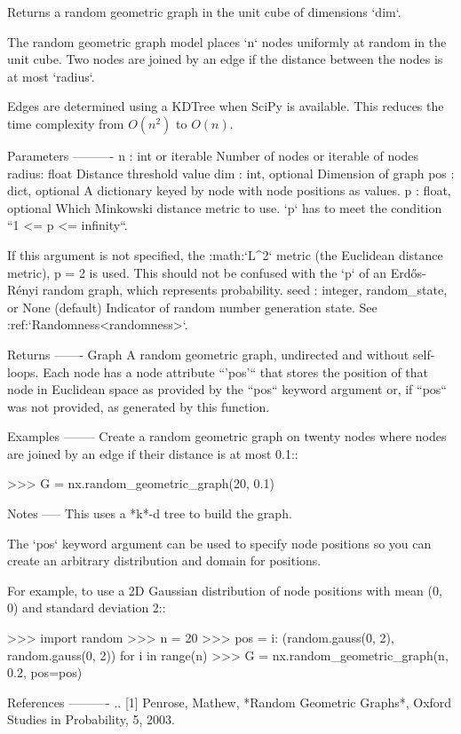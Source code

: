 \begin{DoxyVerb}Returns a random geometric graph in the unit cube of dimensions `dim`.

The random geometric graph model places `n` nodes uniformly at
random in the unit cube. Two nodes are joined by an edge if the
distance between the nodes is at most `radius`.

Edges are determined using a KDTree when SciPy is available.
This reduces the time complexity from $O(n^2)$ to $O(n)$.

Parameters
----------
n : int or iterable
    Number of nodes or iterable of nodes
radius: float
    Distance threshold value
dim : int, optional
    Dimension of graph
pos : dict, optional
    A dictionary keyed by node with node positions as values.
p : float, optional
    Which Minkowski distance metric to use.  `p` has to meet the condition
    ``1 <= p <= infinity``.

    If this argument is not specified, the :math:`L^2` metric
    (the Euclidean distance metric), p = 2 is used.
    This should not be confused with the `p` of an Erdős-Rényi random
    graph, which represents probability.
seed : integer, random_state, or None (default)
    Indicator of random number generation state.
    See :ref:`Randomness<randomness>`.

Returns
-------
Graph
    A random geometric graph, undirected and without self-loops.
    Each node has a node attribute ``'pos'`` that stores the
    position of that node in Euclidean space as provided by the
    ``pos`` keyword argument or, if ``pos`` was not provided, as
    generated by this function.

Examples
--------
Create a random geometric graph on twenty nodes where nodes are joined by
an edge if their distance is at most 0.1::

>>> G = nx.random_geometric_graph(20, 0.1)

Notes
-----
This uses a *k*-d tree to build the graph.

The `pos` keyword argument can be used to specify node positions so you
can create an arbitrary distribution and domain for positions.

For example, to use a 2D Gaussian distribution of node positions with mean
(0, 0) and standard deviation 2::

>>> import random
>>> n = 20
>>> pos = {i: (random.gauss(0, 2), random.gauss(0, 2)) for i in range(n)}
>>> G = nx.random_geometric_graph(n, 0.2, pos=pos)

References
----------
.. [1] Penrose, Mathew, *Random Geometric Graphs*,
       Oxford Studies in Probability, 5, 2003.\end{DoxyVerb}
 \mbox{\label{namespacenetworkx_1_1generators_1_1geometric_a9f8a8e869f0ada3f64fabf3d53129d21}} 
